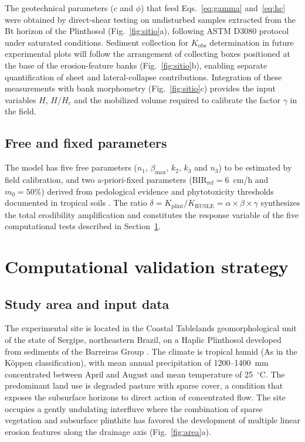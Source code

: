 \documentclass[preprint,review,12pt,authoryear]{elsarticle}
\begin{document}
The geotechnical parameters ($c$ and $\phi$) that feed Eqs.~\ref{eq:gamma} and~\ref{eq:hc} were obtained by direct-shear testing on undisturbed samples extracted from the Bt horizon of the Plinthosol (Fig.~\ref{fig:sitio}a), following ASTM D3080 protocol under saturated conditions. Sediment collection for $K_{\mathrm{obs}}$ determination in future experimental plots will follow the arrangement of collecting boxes positioned at the base of the erosion-feature banks (Fig.~\ref{fig:sitio}b), enabling separate quantification of sheet and lateral-collapse contributions. Integration of these measurements with bank morphometry (Fig.~\ref{fig:sitio}c) provides the input variables $H$, $H/H_c$ and the mobilized volume required to calibrate the factor $\gamma$ in the field.

\subsection{Free and fixed parameters}

The model has five free parameters ($n_1$, $\beta_{\max}$, $k_2$, $k_3$ and $n_3$) to be estimated by field calibration, and two a-priori-fixed parameters ($\mathrm{BIR_{ref}} = 6$~cm/h and $m_0 = 50\%$) derived from pedological evidence and phytotoxicity thresholds documented in tropical soils \citep{embrapa_2018}. The ratio $\delta = K_{\mathrm{plint}} / K_{\mathrm{RUSLE}} = \alpha \times \beta \times \gamma$ synthesizes the total erodibility amplification and constitutes the response variable of the five computational tests described in Section~\ref{sec:validation}.

\section{Computational validation strategy}
\label{sec:validation}

\subsection{Study area and input data}

The experimental site is located in the Coastal Tablelands geomorphological unit of the state of Sergipe, northeastern Brazil, on a Haplic Plinthosol developed from sediments of the Barreiras Group \citep{nascimento_pedrotti_2004}. The climate is tropical humid (As in the K\"{o}ppen classification), with mean annual precipitation of 1200--1400~mm concentrated between April and August and mean temperature of 25~$^\circ$C. The predominant land use is degraded pasture with sparse cover, a condition that exposes the subsurface horizons to direct action of concentrated flow. The site occupies a gently undulating interfluve where the combination of sparse vegetation and subsurface plinthite has favored the development of multiple linear erosion features along the drainage axis (Fig.~\ref{fig:area}a).
\end{document}
